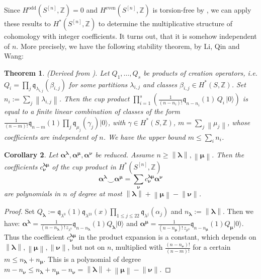\documentclass{amsart}
\newcommand{\hilb}[1]{^{[#1]}}
\newcommand{\ie}{{\it i.e. }}
\newcommand{\vac}{|0\rangle}
\newcommand{\IZ}{\mathbb{Z}}
\newcommand{\kq}{\mathfrak{q}}
\theoremstyle{plain}
\newtheorem{theorem}{Theorem}[section]
\newtheorem{corollary}[theorem]{Corollary}
\theoremstyle{definition}
\theoremstyle{remark}
\begin{document}
Since $H^\text{odd}(S\hilb{n},\IZ) = 0$ and $H^\text{even}(S\hilb{n},\IZ)$ is torsion-free by \cite{Markman}, we can apply these results to $H^\ast(S\hilb{n}, \IZ)$ to determine the multiplicative structure of cohomology with integer coefficients. It turns out, that it is somehow independent of $n$. More precisely, we have the following stability theorem, by Li, Qin and Wang:
\begin{theorem} \emph{(Derived from \cite[Thm.~2.1]{QinWang}).}
Let $Q_1,\ldots,Q_s$ be products of creation operators, \ie $Q_i = \prod_j \kq_{\lambda_{i,j}}(\beta_{i,j}) $ for some partitions $\lambda_{i,j}$ and classes $\beta_{i,j}\in H^\ast(S,\IZ)$. Set $n_i := \sum_j \left\|\lambda_{i,j}\right\|$.
Then the cup product 
$ \prod_{i=1}^s \left(\frac{1}{(n-n_i)!} \kq_{n-n_i}(1) \,Q_i \,\vac \right)$ is equal to a finite linear combination of classes of the form $\frac{1}{(n-m)!}\kq_{n-m}(1)\prod_j \kq_{\mu_{j}}(\gamma_{j})\vac$, with $\gamma\in H^\ast(S,\IZ)$, $m=\sum_j\left\|\mu_j\right\|$, whose coefficients are independent of $n$. We have the upper bound $m\leq\sum_i n_i$. 
\end{theorem}
\begin{corollary} \label{stabCor} Let $\boldsymbol{\alpha}^{\boldsymbol{\lambda}},\boldsymbol{\alpha}^{\boldsymbol{\mu}},\boldsymbol{\alpha}^{\boldsymbol{\nu}}$ be reduced. Assume $n\geq\left\|\boldsymbol\lambda\right\|,\left\|\boldsymbol\mu\right\| $. Then the coefficients $c^{\boldsymbol{\lambda\mu}}_{\boldsymbol{\nu}}$ of the cup product in $H^\ast(S\hilb{n},\IZ)$
$$\boldsymbol{\alpha}^{\boldsymbol{\lambda}} \smile
\boldsymbol{\alpha}^{\boldsymbol{\mu}}
= \sum_{\boldsymbol{\nu}} c^{\boldsymbol{\lambda\mu}}_{\boldsymbol{\nu}} \boldsymbol{\alpha}^{\boldsymbol{\nu}}
$$  
are polynomials in $n$ of degree at most $ \left\|\boldsymbol\lambda\right\|+\left\|\boldsymbol\mu\right\|-\left\|\boldsymbol\nu\right\|$.
\end{corollary}
\begin{proof} Set $Q_{\boldsymbol{\lambda}}:=  \kq_{\lambda^0}(1)\kq_{\lambda^{23}}(x)\prod_{1\leq j\leq 22}\kq_{\lambda^j}(\alpha_j)$ and $n_{\boldsymbol\lambda}:=\left\|\boldsymbol\lambda\right\|$. Then we have:
$\boldsymbol{\alpha}^{\boldsymbol{\lambda}} = \frac{1}{(n-n_{\boldsymbol\lambda})!\,z_{\lambda^0}}\kq_{n-n_{\boldsymbol\lambda}}(1)Q_{\boldsymbol\lambda}\vac$ and $
\boldsymbol{\alpha}^{\boldsymbol{\mu}}=\frac{1}{(n-n_{\boldsymbol\mu})!\,z_{\mu^0}}\kq_{n-n_{\boldsymbol\mu}}(1)Q_{\boldsymbol\mu}\vac $. 
Thus the coefficient $c^{\boldsymbol{\lambda\mu}}_{\boldsymbol{\nu}}$ in the product expansion is a constant, which depends on $ \left\|\boldsymbol\lambda\right\|,\left\|\boldsymbol\mu\right\|,\left\|\boldsymbol\nu\right\|$, but not on $n$, multiplied with $\frac{(n-n_{\boldsymbol\nu})!}{(n-m)!}$ for a certain $m\leq n_{\boldsymbol\lambda}+n_{\boldsymbol\mu}$. 
This is a polynomial of degree $m-n_{\boldsymbol\nu}\leq n_{\boldsymbol\lambda}+n_{\boldsymbol\mu}-n_{\boldsymbol\nu} =\left\|\boldsymbol\lambda\right\|+\left\|\boldsymbol\mu\right\|-\left\|\boldsymbol\nu\right\| $.
\end{proof}
\end{document}
